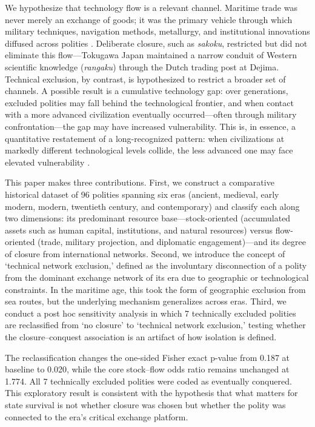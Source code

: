 \documentclass[pdflatex,sn-basic]{sn-jnl}
\theoremstyle{thmstyleone}%
\theoremstyle{thmstyletwo}%
\theoremstyle{thmstylethree}%
\begin{document}
We hypothesize that technology flow is a relevant channel. Maritime trade was never merely an exchange of goods; it was the primary vehicle through which military techniques, navigation methods, metallurgy, and institutional innovations diffused across polities \citep{Pomeranz2000, Mokyr2002}. Deliberate closure, such as \emph{sakoku}, restricted but did not eliminate this flow---Tokugawa Japan maintained a narrow conduit of Western scientific knowledge (\emph{rangaku}) through the Dutch trading post at Dejima. Technical exclusion, by contrast, is hypothesized to restrict a broader set of channels. A possible result is a cumulative technology gap: over generations, excluded polities may fall behind the technological frontier, and when contact with a more advanced civilization eventually occurred---often through military confrontation---the gap may have increased vulnerability. This is, in essence, a quantitative restatement of a long-recognized pattern: when civilizations at markedly different technological levels collide, the less advanced one may face elevated vulnerability \citep{Diamond1997}.

This paper makes three contributions. First, we construct a comparative historical dataset of 96 polities spanning six eras (ancient, medieval, early modern, modern, twentieth century, and contemporary) and classify each along two dimensions: its predominant resource base---stock-oriented (accumulated assets such as human capital, institutions, and natural resources) versus flow-oriented (trade, military projection, and diplomatic engagement)---and its degree of closure from international networks. Second, we introduce the concept of `technical network exclusion,' defined as the involuntary disconnection of a polity from the dominant exchange network of its era due to geographic or technological constraints. In the maritime age, this took the form of geographic exclusion from sea routes, but the underlying mechanism generalizes across eras. Third, we conduct a post hoc sensitivity analysis in which 7 technically excluded polities are reclassified from `no closure' to `technical network exclusion,' testing whether the closure--conquest association is an artifact of how isolation is defined.

The reclassification changes the one-sided Fisher exact p-value from 0.187 at baseline to 0.020, while the core stock--flow odds ratio remains unchanged at 1.774. All 7 technically excluded polities were coded as eventually conquered. This exploratory result is consistent with the hypothesis that what matters for state survival is not whether closure was chosen but whether the polity was connected to the era's critical exchange platform.
\end{document}
